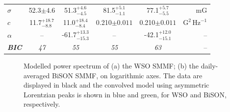 \begin{table}[ht!]
\begin{center}
\begin{tabular}{l c c | c c r}
			{$\sigma$} & {52.3$\pm 4.6$} & {51.3$_{-4.5}^{+4.6}$} & {81.5$_{-1.1}^{+5.1}$} & {77.1$_{-5.5}^{+5.7}$} & {$\mathrm{mG}$} \\	
			
			{$c$} & {11.7$_{-8.8}^{+18.7}$} & {11.0$_{-8.4}^{+18.4}$} & {0.210$\pm 0.011$} & {0.210$\pm 0.011$} & {$\mathrm{G}^2 \, \mathrm{Hz}^{-1}$} \\	
			
			{$\alpha$} & {--} & {-61.7$_{-15.3}^{+13.3}$} & {--} & {-42.1$_{-15.1}^{+12.0}$} & {--} \\	
			\hline
			{\bf \textit{BIC}} & \textit{{47}} & \textit{{55}} & \textit{{55}} & \textit{{63}} & {--} \\	
			\hline
		\end{tabular}
	\end{center}
\end{table}



\begin{figure}[ht!]
	\centering
	\qquad
	\caption{Modelled power spectrum of (a) the WSO SMMF; (b) the daily-averaged BiSON SMMF, on logarithmic axes. The data are displayed in black and the convolved model using asymmetric Lorentzian peaks is shown in blue and green, for WSO and BiSON, respectively.} 
	\label{fig:WSO_and_24h_BiSON_PSD_fit}
\end{figure}

